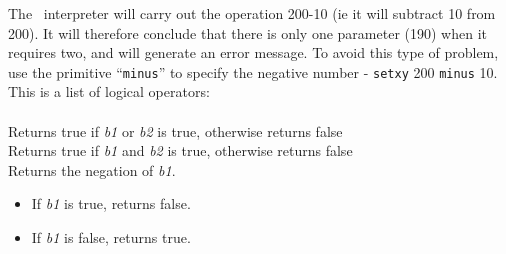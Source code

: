 The \logo\ interpreter will carry out the operation 200-10 (ie it will
subtract 10 from 200). It will therefore conclude that there is only
one parameter (190) when it requires two, and will generate an error
message. To avoid this type of problem, use the primitive {}``\texttt{minus}''
to specify the negative number - \texttt{setxy} 200 \texttt{minus}
10.\\
This is a list of logical operators:\\
\\
Returns true if \textit{b1} or \textit{b2} is true, otherwise returns false\\
Returns true if \textit{b1} and \textit{b2} is true, otherwise returns false\\
Returns the negation of \textit{b1}.
\begin{itemize}
 \item  If \textit{b1} is true, returns false.
 \item  If \textit{b1} is false, returns true.
\end{itemize}

